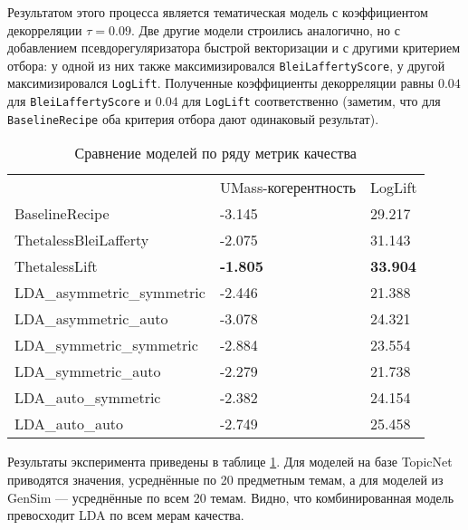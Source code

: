 Результатом этого процесса является тематическая модель с коэффициентом декорреляции $\tau=0.09$. Две другие модели строились аналогично, но с добавлением псевдорегуляризатора быстрой векторизации и с другими критерием отбора: у одной из них также максимизировался \texttt{BleiLaffertyScore}, у другой максимизировался \texttt{LogLift}. Полученные коэффициенты декорреляции равны $0.04$ для \texttt{BleiLaffertyScore} и $0.04$ для \texttt{LogLift} соответственно (заметим, что для \texttt{BaselineRecipe} оба критерия отбора дают одинаковый результат).  


\begin{table}[]
\begin{tabular}{lll}
                         & UMass-когерентность & LogLift             \\
BaselineRecipe           & -3.145         & 29.217         \\
ThetalessBleiLafferty   & -2.075         & 31.143           \\
ThetalessLift           & \textbf{-1.805}  & \textbf{33.904} \\
LDA\_asymmetric\_symmetric & -2.446          & 21.388           \\
LDA\_asymmetric\_auto      & -3.078          & 24.321          \\
LDA\_symmetric\_symmetric  & -2.884          & 23.554         \\
LDA\_symmetric\_auto       & -2.279         & 21.738          \\
LDA\_auto\_symmetric       & -2.382           & 24.154          \\
LDA\_auto\_auto            & -2.749          & 25.458
\end{tabular}
\label{tab:better_baseline}
\caption{Сравнение моделей по ряду метрик качества}
\end{table} 

Результаты эксперимента приведены в таблице \ref{tab:better_baseline}. Для моделей на базе TopicNet приводятся значения, усреднённые по 20 предметным темам, а для моделей из GenSim --- усреднённые по всем 20 темам. Видно, что комбинированная модель превосходит LDA по всем мерам качества.  



